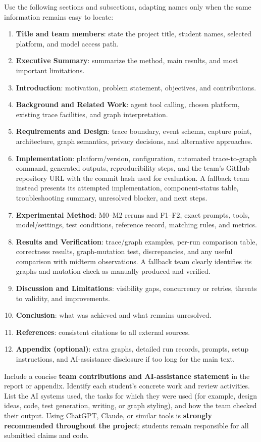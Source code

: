 \documentclass[11pt]{article}
\begin{document}
Use the following sections and subsections, adapting names only when the same information remains easy to locate:
\begin{enumerate}
  \item \textbf{Title and team members}: state the project title, student names, selected platform, and model access path.
  \item \textbf{Executive Summary}: summarize the method, main results, and most important limitations.
  \item \textbf{Introduction}: motivation, problem statement, objectives, and contributions.
  \item \textbf{Background and Related Work}: agent tool calling, chosen platform, existing trace facilities, and graph interpretation.
  \item \textbf{Requirements and Design}: trace boundary, event schema, capture point, architecture, graph semantics, privacy decisions, and alternative approaches.
  \item \textbf{Implementation}: platform/version, configuration, automated trace-to-graph command, generated outputs, reproducibility steps, and the team's GitHub repository URL with the commit hash used for evaluation. A fallback team instead presents its attempted implementation, component-status table, troubleshooting summary, unresolved blocker, and next steps.
  \item \textbf{Experimental Method}: M0--M2 reruns and F1--F2, exact prompts, tools, model/settings, test conditions, reference record, matching rules, and metrics.
  \item \textbf{Results and Verification}: trace/graph examples, per-run comparison table, correctness results, graph-mutation test, discrepancies, and any useful comparison with midterm observations. A fallback team clearly identifies its graphs and mutation check as manually produced and verified.
  \item \textbf{Discussion and Limitations}: visibility gaps, concurrency or retries, threats to validity, and improvements.
  \item \textbf{Conclusion}: what was achieved and what remains unresolved.
  \item \textbf{References}: consistent citations to all external sources.
  \item \textbf{Appendix (optional)}: extra graphs, detailed run records, prompts, setup instructions, and AI-assistance disclosure if too long for the main text.
\end{enumerate}
Include a concise \textbf{team contributions and AI-assistance statement} in the report or appendix. Identify each student's concrete work and review activities. List the AI systems used, the tasks for which they were used (for example, design ideas, code, test generation, writing, or graph styling), and how the team checked their output. Using ChatGPT, Claude, or similar tools is \textbf{strongly recommended throughout the project}; students remain responsible for all submitted claims and code.
\end{document}

